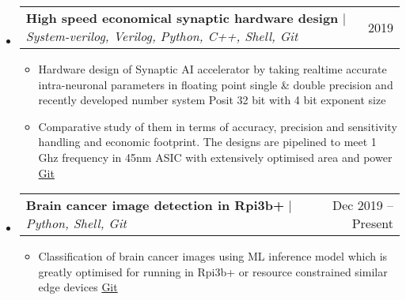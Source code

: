 \documentclass[letterpaper,11pt]{article}
\makeatletter
\newcommand{\resumeItem}[1]{
  \item\small{
    {#1 \vspace{-2pt}}
  }
}
\newcommand{\resumeProjectHeading}[2]{
    \item
    \begin{tabular*}{0.97\textwidth}{l@{\extracolsep{\fill}}r}
      \small#1 & #2 \\
    \end{tabular*}\vspace{-7pt}
}
\newcommand{\resumeSubHeadingListStart}{\begin{itemize}[leftmargin=0.15in, label={}]}
\newcommand{\resumeSubHeadingListEnd}{\end{itemize}}
\newcommand{\resumeItemListStart}{\begin{itemize}}
\newcommand{\resumeItemListEnd}{\end{itemize}\vspace{-5pt}}
\makeatother
\begin{document}
    \resumeSubHeadingListStart
      \resumeProjectHeading
          {\textbf{\footnotesize High speed economical synaptic hardware design} $|$ \emph{\footnotesize System-verilog, Verilog, Python, C++, Shell, Git}}{\footnotesize 2019}
          \resumeItemListStart
            \resumeItem{\footnotesize Hardware design of Synaptic AI accelerator by taking realtime accurate intra-neuronal parameters in floating point single \& double precision and recently developed number system Posit 32 bit with 4 bit exponent size}
            \resumeItem{\footnotesize Comparative study of them in terms of accuracy, precision and sensitivity handling and economic footprint. The designs are pipelined to meet 1 Ghz frequency in 45nm ASIC with extensively optimised area and power {\href{https://github.com/Soham-coder/Presync}{\color{blue}Git}}}
          \resumeItemListEnd
    \resumeSubHeadingListEnd
    
    \resumeSubHeadingListStart
      \resumeProjectHeading
          {\textbf{\footnotesize Brain cancer image detection in Rpi3b+} $|$ \emph{\footnotesize Python, Shell, Git}}{\footnotesize Dec 2019 -- Present}
          \resumeItemListStart
            \resumeItem{\footnotesize Classification of brain cancer images using ML inference model which is greatly optimised for running in Rpi3b+ or resource constrained similar edge devices {\href{https://github.com/Soham-coder/Raspberry_pi_edge_ML}{\color{blue}Git}}}
          \resumeItemListEnd
    \resumeSubHeadingListEnd
    
\end{document}

